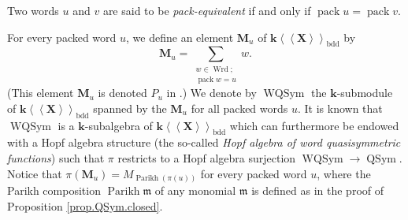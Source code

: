 \documentclass
[numbers=enddot,12pt,final,onecolumn,notitlepage,abstracton]{scrartcl}%
\theoremstyle{definition}
\newenvironment{noncompile}{}{}
\let\sumnonlimits\sum
\renewcommand{\sum}{\sumnonlimits\limits}
\begin{document}
\begin{noncompile}
Two words $u$ and $v$ are said to be \textit{pack-equivalent} if and only if
$\operatorname*{pack}u=\operatorname*{pack}v$.
\end{noncompile}

For every packed word $u$, we define an element $\mathbf{M}_{u}$ of
$\mathbf{k}\left\langle \left\langle \mathbf{X}\right\rangle \right\rangle
_{\operatorname*{bdd}}$ by%
\[
\mathbf{M}_{u}=\sum_{\substack{w\in\operatorname*{Wrd};\\\operatorname*{pack}%
w=u}}w.
\]
(This element $\mathbf{M}_{u}$ is denoted $P_{u}$ in \cite[Section 5.1]%
{AFNT}.) We denote by $\operatorname*{WQSym}$ the $\mathbf{k}$-submodule of
$\mathbf{k}\left\langle \left\langle \mathbf{X}\right\rangle \right\rangle
_{\operatorname*{bdd}}$ spanned by the $\mathbf{M}_{u}$ for all packed words
$u$. It is known that $\operatorname*{WQSym}$ is a $\mathbf{k}$-subalgebra of
$\mathbf{k}\left\langle \left\langle \mathbf{X}\right\rangle \right\rangle
_{\operatorname*{bdd}}$ which can furthermore be endowed with a Hopf algebra
structure (the so-called \textit{Hopf algebra of word quasisymmetric
functions}) such that $\pi$ restricts to a Hopf algebra surjection
$\operatorname*{WQSym}\rightarrow\operatorname*{QSym}$. Notice that
$\pi\left(  \mathbf{M}_{u}\right)  =M_{\operatorname*{Parikh}\left(
\pi\left(  u\right)  \right)  }$ for every packed word $u$, where the Parikh
composition $\operatorname*{Parikh}\mathfrak{m}$ of any monomial
$\mathfrak{m}$ is defined as in the proof of Proposition
\ref{prop.QSym.closed}.
\end{document}

